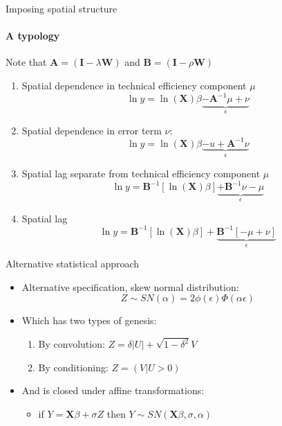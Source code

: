 \documentclass[presentation]{beamer}
\begin{document}
\begin{frame}{Imposing spatial structure}
\framesubtitle{A typology}
Note that $\mathbf{A} = \left(\mathbf{I} - \lambda\mathbf{W}\right)$ and $\mathbf{B} = \left(\mathbf{I} - \rho\mathbf{W}\right)$
	\begin{enumerate}
		\item Spatial dependence in technical efficiency component $\mu$
		\begin{equation*}					
			\ln y = \ln(\mathbf{X}) \beta \underbrace{- \mathbf{A}^{-1}\mu + \nu}_\epsilon
		\end{equation*}
		\item Spatial dependence in error term $\nu$:
		\begin{equation*}					
			\ln y = \ln(\mathbf{X}) \beta \underbrace{- u +  \mathbf{A}^{-1}\nu}_\epsilon
		\end{equation*}
		\item Spatial lag separate from technical efficiency component $\mu$
		\begin{equation*}					
			\ln y =  \mathbf{B}^{-1}\left[\ln(\mathbf{X}) \beta\right] \underbrace{+ \mathbf{B}^{-1}\nu - \mu}_{\epsilon}
		\end{equation*}
		\item Spatial lag
		\begin{equation*}					
			\ln y = \mathbf{B}^{-1}\left[\ln(\mathbf{X}) \beta \right]+  \underbrace{\mathbf{B}^{-1}\left[- \mu + \nu\right]}_\epsilon
		\end{equation*}
	\end{enumerate}
\end{frame}

\begin{frame}{Alternative statistical approach}
	\begin{itemize}
		\item Alternative specification, skew normal distribution:
		\begin{equation*}
		Z \sim SN(\alpha) = 2\phi(\epsilon)\Phi(\alpha \epsilon)
		\end{equation*}
		\pause
		\item Which has two types of genesis:
		\begin{enumerate}
			\item By convolution: $Z = \delta|U| + \sqrt{1-\delta^2}V$
			\item By conditioning: $Z = (V|U>0)$
			\newline
		\end{enumerate}
		\pause
		\item And is closed under affine transformations: 
		\begin{itemize}
			\item if $Y = \mathbf{X}\beta + \sigma Z$ then $Y \sim SN(\mathbf{X}\beta,\sigma, \alpha)$
		\end{itemize}
	\end{itemize}
\end{frame}
\end{document}
